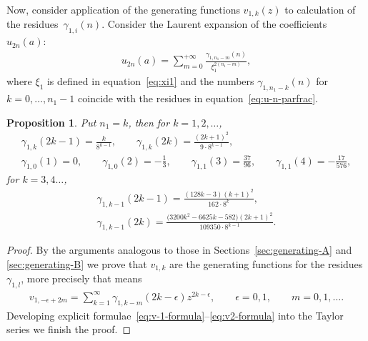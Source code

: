 \documentclass[pdftex]{sigma}
\numberwithin{equation}{section}
\newtheorem{Proposition}[Theorem]{Proposition}
 { \theoremstyle{definition}
\newtheorem{Remark}[Theorem]{Remark} }
\begin{document}
Now, consider application of the generating functions $v_{1,k}(z)$ to calculation of the resi\-dues~$\gamma_{1,i}(n)$. Consider
the Laurent expansion of the coefficients $u_{2n}(a)$:
\begin{gather*}%
u_{2n}(a)=\sum\limits_{m=0}^{+\infty}\frac{\gamma_{1,n_1-m}(n)}{\xi_1^{2(n_1-m)}},
\end{gather*}
where $\xi_1$ is defined in equation~\eqref{eq:xi1} and the numbers $\gamma_{1,n_1-k}(n)$ for $k=0,\ldots, n_1-1$ coincide
with the residues in equation~\eqref{eq:u-n-parfrac}.
\begin{Proposition}\label{prop:small-gamma1k}
Put $n_1=k$, then for $k=1,2,\ldots$,
\begin{gather}\label{eq:gamma-n1}
\gamma_{1,k}(2k-1)=\frac{k}{8^{k-1}},\qquad
\gamma_{1,k}(2k)=\frac{(2k+1)^2}{9\cdot8^{k-1}},
\\
\label{eq:gamma-n1-1-small}
\gamma_{1,0}(1)=0,\qquad
\gamma_{1,0}(2)=-\frac13,\qquad
\gamma_{1,1}(3)=\frac{37}{96},\qquad
\gamma_{1,1}(4)=-\frac{17}{576},
\end{gather}
for $k=3,4\ldots$,
\begin{gather}
\gamma_{1,k-1}(2k-1)=\frac{(128k-3)(k+1)^2}{162\cdot8^{k}},\nonumber\\
\gamma_{1,k-1}(2k)=\frac{\big(3200k^2-6625k-582\big)(2k+1)^2}{109350\cdot8^{k-1}}.\label{eq:gamma-n1-1-general}
\end{gather}
\end{Proposition}
\begin{proof}
By the arguments analogous to those in Sections~\ref{sec:generating-A} and \ref{sec:generating-B} we prove that
$v_{1,k}$ are the generating functions for the residues $\gamma_{1,l}$, more precisely that means
\begin{gather*}
v_{1,-\epsilon+2m}=\sum\limits_{k=1}^\infty\gamma_{1,k-m}(2k-\epsilon)z^{2k-\epsilon},\qquad \epsilon=0,1,\qquad m=0,1,\ldots.
\end{gather*}
Developing explicit formulae~\eqref{eq:v-1-formula}--\eqref{eq:v2-formula} into the Taylor series we finish the proof.
\end{proof}
\end{document}
